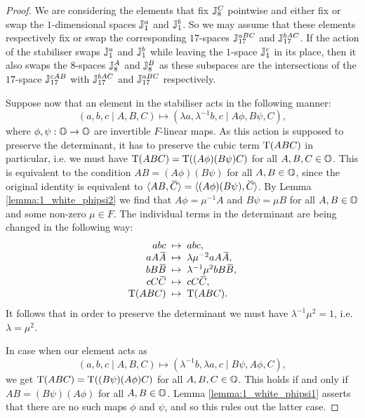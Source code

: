 \begin{proof}
	We are considering the elements that fix $\mathbb{J}_{8}^C$ pointwise
    and either fix or swap the $1$-dimensional spaces $\mathbb{J}_1^a$ and $\mathbb{J}_1^b$. 
    So we may assume that these elements respectively fix or swap the corresponding
    $17$-spaces $\mathbb{J}_{17}^{aBC}$ and $\mathbb{J}_{17}^{bAC}$.
    If the action of the
     stabiliser
    swaps $\mathbb{J}_1^a$ and $\mathbb{J}_1^b$ while leaving the $1$-space $\mathbb{J}_1^c$ in its
    place, then it also swaps the $8$-spaces $\mathbb{J}_8^A$ and
    $\mathbb{J}_8^B$ as these subspaces are the intersections of the $17$-space
    $\mathbb{J}_{17}^{cAB}$ with $\mathbb{J}_{17}^{bAC}$ and $\mathbb{J}_{17}^{aBC}$ respectively.
    
   	Suppose now that an element in the stabiliser acts in the following manner:
    \begin{equation*}
            (a,b,c\mid A,B,C) \mapsto (\lambda a, \lambda^{-1} b, c \mid
                A \phi, B\psi, C),
    \end{equation*}
    where $\phi, \psi : \mathbb{O} \rightarrow \mathbb{O}$ are invertible $F$-linear maps.
    As this action is supposed to  preserve the determinant, it has to preserve the cubic term
    $\operatorname{T}(ABC)$ in particular, i.e. we must have $\operatorname{T}(ABC) = \operatorname{T}((A\phi) (B\psi) C)$ for all 
    $A,B,C \in \mathbb{O}$. This
    is equivalent to the condition $AB = (A\phi) (B\psi)$ for all $A,B \in \mathbb{O}$, since the 
    original identity is equivalent to
    $\langle AB, \ovC  \rangle = \langle (A\phi)(B\psi) , \ovC  \rangle$.
    By Lemma \ref{lemma:1_white_phipsi2} we find that $A \phi = \mu^{-1} A$ and
    $B \psi = \mu B$ for all $A,B \in \mathbb{O}$ and some non-zero $\mu \in F$. The individual terms in
     the determinant are being
    changed in the following way:
    \begin{equation*}
        \begin{array}{r@{\;\;}c@{\;\;}l}
        abc & \mapsto & abc, \\
        a A \ovA  & \mapsto & \lambda \mu^{-2} a A \ovA , \\
        b B \ovB  & \mapsto & \lambda^{-1} \mu^2 b B \ovB , \\
        c C \ovC  & \mapsto & c C \ovC ,\\
        \Tr(ABC) & \mapsto & \Tr(ABC).
    \end{array}
    \end{equation*}
    It follows that in order to preserve the determinant we must have $\lambda^{-1} \mu^2 = 1$,
    i.e. $\lambda = \mu^2$.
    
    In case when our element acts as
    \begin{equation*}
   		(a,b,c\mid A,B,C) \mapsto (\lambda^{-1} b, \lambda a, c \mid B\psi, A\phi, C),
   	\end{equation*}
    we get $\operatorname{T}(ABC) = \operatorname{T}((B\psi) (A\phi) C)$
    for all $A,B,C \in \mathbb{O}$. This holds if and only if $AB = (B\psi) (A\phi)$ for
    all $A,B \in \mathbb{O}$. Lemma
    \ref{lemma:1_white_phipsi1} asserts that there are no such maps $\phi$ and $\psi$,
    and so this rules out the latter case.
    

\end{proof}
